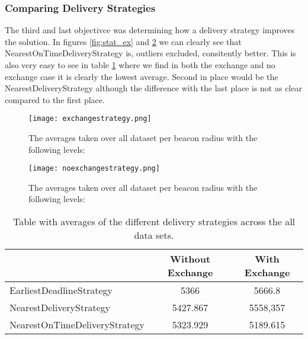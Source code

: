 \documentclass[../main.tex]{subfiles}
\begin{document}
\subsubsection{Comparing Delivery Strategies}
The third and last objectivce was determining how a delivery strategy improves the solution.
In figures \ref{fig:stat_ex} and \ref{fig:strat_noex} we can clearly see that NearestOnTimeDeliveryStrategy is, outliers excluded, consitently better.
This is also very easy to see in table \ref{tab:avgstrat} where we find in both the exchange and no exchange case it is clearly the lowest average.
Second in place would be the NearestDeliveryStrategy although the difference with the last place is not as clear compared to the first place.
\begin{figure}
	\centering
	\texttt{[image: exchangestrategy.png]}
	\caption{The averages taken over all dataset per beacon radius with the following levels:}
	\label{fig:strat_ex}
\end{figure}

\begin{figure}
	\centering
	\texttt{[image: noexchangestrategy.png]}
	\caption{The averages taken over all dataset per beacon radius with the following levels:}
	\label{fig:strat_noex}
\end{figure}
\begin{table}
\begin{tabular}{lcc}
	\toprule
	& Without Exchange & With Exchange \\
	\midrule
	EarliestDeadlineStrategy & 5366 & 5666.8 \\
	NearestDeliveryStrategy & 5427.867 & 5558,357 \\
	NearestOnTimeDeliveryStrategy & 5323.929 & 5189.615 \\
	\bottomrule
\end{tabular}
\caption{Table with averages of the different delivery strategies across the all data sets.}
\label{tab:avgstrat}
\end{table}
\end{document}
